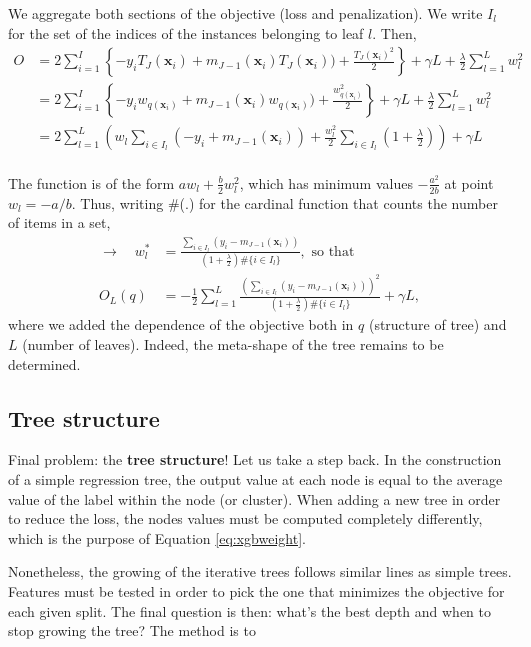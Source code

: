 \documentclass[]{krantz}
\theoremstyle{definition}
\theoremstyle{definition}
\theoremstyle{definition}
\theoremstyle{remark}
\begin{document}
We aggregate both sections of the objective (loss and penalization). We
write \(I_l\) for the set of the indices of the instances belonging to
leaf \(l\). Then,\\
\begin{align*}
O&= 2\sum_{i=1}^I\left\{ -y_iT_J(\mathbf{x}_i)+m_{J-1}(\mathbf{x}_i) T_J(\mathbf{x}_i))+\frac{T_J(\mathbf{x}_i)^2}{2} \right\} + \gamma L+\frac{\lambda}{2}\sum_{l=1}^Lw_l^2 \\
&=2\sum_{i=1}^I\left\{- y_iw_{q(\mathbf{x}_i)}+m_{J-1}(\mathbf{x}_i)w_{q(\mathbf{x}_i)})+\frac{w_{q(\mathbf{x}_i)}^2}{2} \right\} + \gamma L+\frac{\lambda}{2}\sum_{l=1}^Lw_l^2 \\
&=2 \sum_{l=1}^L \left(w_l\sum_{i\in I_l}(-y_i +m_{J-1}(\mathbf{x}_i))+ \frac{w_l^2}{2}\sum_{i\in I_l}\left(1+\frac{\lambda}{2}\right)\right)+ \gamma L
\end{align*}\\
The function is of the form \(aw_l+\frac{b}{2}w_l^2\), which has minimum
values \(-\frac{a^2}{2b}\) at point \(w_l=-a/b\). Thus, writing \#(.)
for the cardinal function that counts the number of items in a set,
\begin{align}
\label{eq:xgbweight}
\mathbf{\rightarrow} \quad w^*_l&=\frac{\sum_{i\in I_l}(y_i -m_{J-1}(\mathbf{x}_i))}{\left(1+\frac{\lambda}{2}\right)\#\{i\in I_l\}}, \text{ so that} \\
O_L(q)&=-\frac{1}{2}\sum_{l=1}^L \frac{\left(\sum_{i\in I_l}(y_i -m_{J-1}(\mathbf{x}_i))\right)^2}{\left(1+\frac{\lambda}{2}\right)\#\{i\in I_l\}}+\gamma L, \nonumber
\end{align} where we added the dependence of the objective both in \(q\)
(structure of tree) and \(L\) (number of leaves). Indeed, the meta-shape
of the tree remains to be determined.

\hypertarget{tree-structure}{%
\subsection{Tree structure}\label{tree-structure}}

Final problem: the \textbf{tree structure}! Let us take a step back. In
the construction of a simple regression tree, the output value at each
node is equal to the average value of the label within the node (or
cluster). When adding a new tree in order to reduce the loss, the nodes
values must be computed completely differently, which is the purpose of
Equation \eqref{eq:xgbweight}.

Nonetheless, the growing of the iterative trees follows similar lines as
simple trees. Features must be tested in order to pick the one that
minimizes the objective for each given split. The final question is
then: what's the best depth and when to stop growing the tree? The
method is to
\end{document}
